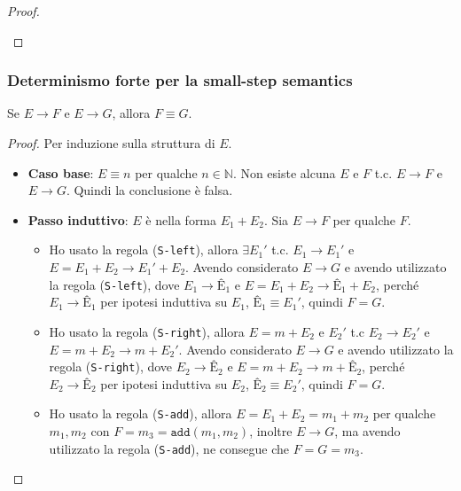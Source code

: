 \begin{proof}
\begin{itemize}
\begin{itemize}
      \begin{prooftree}
      \end{prooftree}
    \end{itemize}
  \end{itemize}
\end{proof}
\subsubsection{Determinismo forte per la small-step semantics}
\begin{tcolorbox}[title = {Determinismo forte per la small-step semantics}]
  Se $E \rightarrow F$ e $E \rightarrow G$, allora $F \equiv G$.
\end{tcolorbox}
\begin{proof}
  Per induzione sulla struttura di $E$.
  \begin{itemize}
    \item \textbf{Caso base}: $E \equiv n$ per qualche $n \in \mathbb{N}$. Non 
    esiste alcuna $E$ e $F$ t.c. $E \rightarrow F$ e $E \rightarrow G$. Quindi 
    la conclusione  è falsa. 
    \item \textbf{Passo induttivo}: $E$ è nella forma $E_1 + E_2$.
    Sia $E \rightarrow F$ per qualche $F$.
    \begin{itemize}
      \item Ho usato la regola (\texttt{S-left}), allora $\exists E_1'$ t.c. 
      $E_1 \rightarrow E_1'$ e $E = E_1 + E_2 \rightarrow E_1' + E_2$.
      Avendo considerato $E \rightarrow G$ e avendo utilizzato la regola 
      (\texttt{S-left}), dove $E_1 \rightarrow \text{\^E}_1$ e 
      $E = E_1 + E_2 \rightarrow \text{\^E}_1 + E_2$, perché $E_1 \rightarrow
      \text{\^E}_1$ per ipotesi induttiva su $E_1$, $\text{\^E}_1 \equiv E_1'$, 
      quindi $F=G$.
      \item Ho usato la regola (\texttt{S-right}), allora $E = m + E_2$ e
      $E_2'$ t.c $E_2 \rightarrow E_2'$ e $E = m + E_2 \rightarrow m + E_2'$.
      Avendo considerato $E \rightarrow G$ e avendo utilizzato la regola 
      (\texttt{S-right}), dove $E_2 \rightarrow \text{\^E}_2$ e 
      $E = m + E_2 \rightarrow m + \text{\^E}_2$, perché $E_2 \rightarrow
      \text{\^E}_2$ per ipotesi induttiva su $E_2$, $\text{\^E}_2 \equiv E_2'$,
      quindi $F=G$.
      \item Ho usato la regola (\texttt{S-add}), allora $E = E_1 + E_2 = m_1 + m_2$ 
      per qualche $m_1, m_2$ con $F=m_3 = \texttt{add}(m_1, m_2)$, 
      inoltre $E \rightarrow G$, ma avendo utilizzato la regola (\texttt{S-add}),
      ne consegue che $F=G=m_3$.
      
    \end{itemize}
  \end{itemize}
\end{proof}
